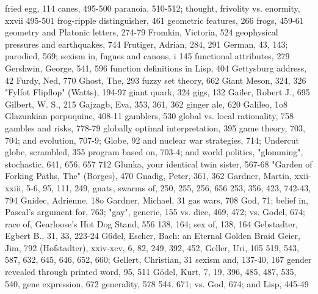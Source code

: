 fried egg, 114                                    canes, 495-500 paranoia, 510-512; thought,
frivolity vs. enormity, xxvii                     495-501
frog-ripple distinguisher, 461                   geometric features, 266
frogs, 459-61                                    geometry and Platonic letters, 274-79
Fromkin, Victoria, 524                           geophysical pressures and earthquakes, 744
Frutiger, Adrian, 284, 291                       German, 43, 143; parodied, 569; sexism in,
fugues and canons, i                              145
functional attributes, 279                       Gershwin, George, 541, 596
function definitions in Lisp, 404                Gettysburg address, 42
Furdy, Ned, 770                                  Ghost, The, 293
fuzzy set theory, 662                            Giant Meson, 324, 326
"Fylfot Flipflop" (Watts), 194-97                giant quark, 324
                                                 gigs, 132
Gailer, Robert J., 695                           Gilbert, W. S., 215
Gajzagb, Eva, 353, 361, 362                      ginger ale, 620
Galileo, 1o8                                     Glazunkian porpuquine, 408-11
gamblers, 530                                    global vs. local rationality, 758
gambles and risks, 778-79                        globally optimal interpretation, 395
game theory, 703, 704; and evolution, 707-9; Globe, 92
 and nuclear war strategies, 714; Undercut       globe, scrambled, 355
 program based on, 703-4; and world politics, "glomming", stochastic, 641, 656, 657
 712                                             Glunka, your identical twin sister, 567-68
"Garden of Forking Paths, The" (Borges), 470 Gnadig, Peter, 361, 362
Gardner, Martin, xxii-xxiii, 5-6, 95, 111, 249, gnats, swarms of, 250, 255, 256, 656
 253, 356, 423, 742-43, 794                      Gnidec, Adrienne, 18o
Gardner, Michael, 31 gas wars, 708               God, 71; belief in, Pascal's argument for, 763;
"gay", generic, 155                               vs. dice, 469, 472; vs. Godel, 674; race of,
Gearloose's Hot Dog Stand, 556                    138, 164; sex of, 138, 164
Gebstadter, Egbert B., 31, 33, 223-24            G6del,  Escher, Bach: an Eternal Golden Braid
Geier, Jim, 792                                   (Hofstadter), xxiv-xcv, 6, 82, 249, 392, 452,
Geller, Uri, 105                                  519, 543, 587, 632, 645, 646, 652, 660;
Gellert, Christian, 31                            sexism and, 137-40, 167
gender revealed through printed word, 95, 511 Gödel, Kurt, 7, 19, 396, 485, 487, 535, 540,
gene expression, 672 generality, 578              544. 671; vs. God, 674; and Lisp, 445-49
